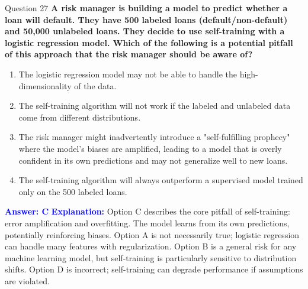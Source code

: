 \documentclass{beamer}
\begin{document}
	\begin{frame}{Question 27}
		\textbf{A risk manager is building a model to predict whether a loan will default. They have 500 labeled loans (default/non-default) and 50,000 unlabeled loans. They decide to use self-training with a logistic regression model. Which of the following is a potential pitfall of this approach that the risk manager should be aware of?}
		\begin{enumerate}
			\item The logistic regression model may not be able to handle the high-dimensionality of the data.
			\item The self-training algorithm will not work if the labeled and unlabeled data come from different distributions.
			\item The risk manager might inadvertently introduce a "self-fulfilling prophecy" where the model's biases are amplified, leading to a model that is overly confident in its own predictions and may not generalize well to new loans.
			\item The self-training algorithm will always outperform a supervised model trained only on the 500 labeled loans.
		\end{enumerate}
		\vspace{0.2cm}
		\textcolor{blue}{\textbf{Answer: C}}
		\vspace{0.2cm}
		\textcolor{blue}{\textbf{Explanation:}} Option C describes the core pitfall of self-training: error amplification and overfitting. The model learns from its own predictions, potentially reinforcing biases. Option A is not necessarily true; logistic regression can handle many features with regularization. Option B is a general risk for any machine learning model, but self-training is particularly sensitive to distribution shifts. Option D is incorrect; self-training can degrade performance if assumptions are violated.
	\end{frame}
	
\end{document}
